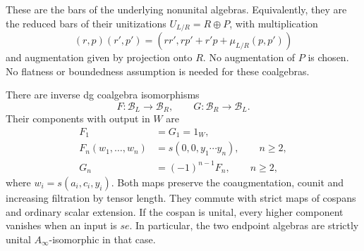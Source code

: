 These are the bars of the underlying nonunital algebras. Equivalently,
they are the reduced bars of their unitizations \(U_{L/R}=R\oplus P\),
with multiplication
\[
 (r,p)(r',p')=(rr',rp'+r'p+\mu_{L/R}(p,p'))
\]
and augmentation given by projection onto \(R\). No augmentation of \(P\) is chosen.
No flatness or boundedness assumption is needed for these coalgebras.

\begin{theorem}
\label{v4-arith:gluing:thm:comparison}
There are inverse dg coalgebra isomorphisms
\[
 F:\mathcal B_L\longrightarrow\mathcal B_R,
 \qquad G:\mathcal B_R\longrightarrow\mathcal B_L.
\]
Their components with output in \(W\) are
\begin{equation}\label{v4-arith:gluing:eq:taylor}
 \begin{split}
 F_1&=G_1=1_W,\\
 F_n(w_1,\ldots,w_n)&=s(0,0,y_1\cdots y_n),\qquad n\geq2,\\
 G_n&=(-1)^{n-1}F_n,\qquad n\geq2,
 \end{split}
\end{equation}
where \(w_i=s(a_i,c_i,y_i)\). Both maps preserve the coaugmentation,
counit and increasing filtration by tensor length. They commute with
strict maps of cospans and ordinary scalar extension. If the cospan is
unital, every higher component vanishes when an input is \(se\).
In particular, the two endpoint algebras are strictly unital
\(A_\infty\)-isomorphic in that case.
\end{theorem}

